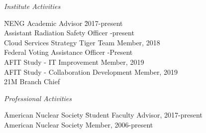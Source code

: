 \textit{Institute Activities}
\begin{tabbing}
\hspace*{2 em}\= NENG Academic Advisor  \hspace*{12em} \= 2017-present\\
%
\> Assistant Radiation Safety Officer -present  \\
%
\> Cloud Services Strategy Tiger Team \> Member, 2018\\
%
\> Federal Voting Assistance Officer -Present\\
%
\> AFIT Study - IT Improvement \> Member, 2019\\
%
\> AFIT Study - Collaboration Development \> Member, 2019\\
%
\> 21M Branch Chief \\

\end{tabbing}

\textit{Professional Activities}
\begin{tabbing}
\hspace*{2 em}\= American Nuclear Society  \hspace*{12em} \= Student Faculty Advisor, 2017-present\\
%
\> American Nuclear Society \> Member, 2006-present  \\
\end{tabbing}

